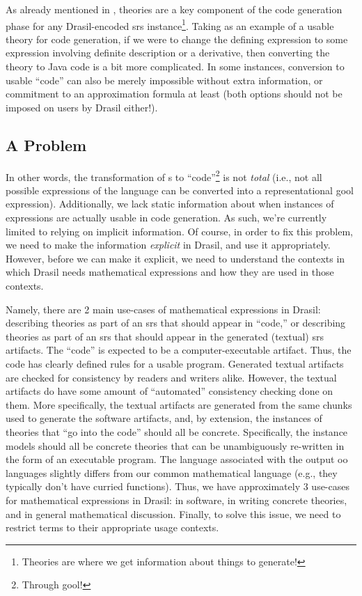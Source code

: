 \pseudoExampleExpression{}

As already mentioned in , theories are a key component of
the code generation phase for any Drasil-encoded \acs{srs}
instance\footnote{Theories are where we get information about things to
generate!}. Taking  as an example of a usable theory for
code generation, if we were to change the defining expression to some expression
involving definite description or a derivative, then converting the theory to
Java code is a bit more complicated. In some instances, conversion to usable
``code'' can also be merely impossible without extra information, or commitment
to an approximation formula at least (both options should not be imposed on
users by Drasil either!).

\subsection{A Problem}
\label{chap:lang-division:sec:a-mathematical-language:subsec:a-problem}

In other words, the transformation of \Expr{}s to ``code''\footnote{Through
\acs{gool}!} is not \textit{total} (i.e., not all possible expressions of the
\Expr{} language can be converted into a representational \acs{gool}
expression). Additionally, we lack static information about when instances of
expressions are actually usable in code generation. As such, we're currently
limited to relying on implicit information. Of course, in order to fix this
problem, we need to make the information \textit{explicit} in Drasil, and use it
appropriately. However, before we can make it explicit, we need to understand
the contexts in which Drasil needs mathematical expressions and how they are
used in those contexts.

Namely, there are 2 main use-cases of mathematical expressions in Drasil:
describing theories as part of an \acs{srs} that should appear in ``code,'' or
describing theories as part of an \acs{srs} that should appear in the generated
(textual) \acs{srs} artifacts. The ``code'' is expected to be a
computer-executable artifact. Thus, the code has clearly defined rules for a
usable program. Generated textual artifacts are checked for consistency by
readers and writers alike. However, the textual artifacts do have some amount of
``automated'' consistency checking done on them. More specifically, the textual
artifacts are generated from the same chunks used to generate the software
artifacts, and, by extension, the instances of theories that ``go into the
code'' should all be concrete. Specifically, the instance models should all be
concrete theories that can be unambiguously re-written in the form of an
executable program. The language associated with the output \acs{oo} languages
slightly differs from our common mathematical language (e.g., they typically
don't have curried functions). Thus, we have approximately 3 use-cases for
mathematical expressions in Drasil: in software, in writing concrete theories,
and in general mathematical discussion. Finally, to solve this issue, we need to
restrict terms to their appropriate usage contexts.

